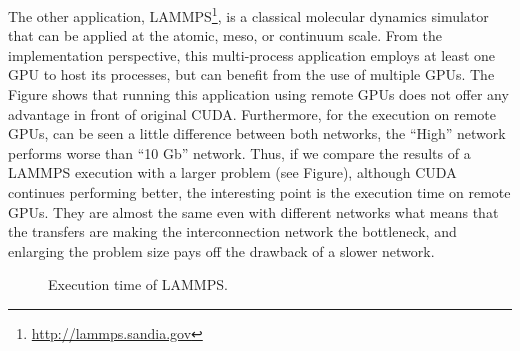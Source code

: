 \documentclass[a4paper,twoside]{article}
\begin{document}
The other application, LAMMPS\footnote{\url{http://lammps.sandia.gov}}, is a classical molecular dynamics simulator that can be applied at the atomic, meso, or continuum scale. 
From the implementation perspective, this multi-process application employs at least one GPU to host its processes, but can benefit from the use of multiple GPUs.
The Figure shows that running this application using remote GPUs does not offer any advantage in front of original CUDA. 
Furthermore, for the execution on remote GPUs, can be seen a little difference between both networks, the ``High'' network performs worse than ``10 Gb'' network.
Thus, if we compare the results of a LAMMPS execution with a larger problem (see Figure), although CUDA continues performing better, the interesting point is the execution time on remote GPUs. 
They are almost the same even with different networks what means that the transfers are making the interconnection network the bottleneck, and enlarging the problem size
pays off the drawback of a slower network.

\begin{figure}[htb]
\centering
{}
\quad
{}
\caption{Execution time of LAMMPS.}
\label{fig:lammps}
\end{figure}
\end{document}
